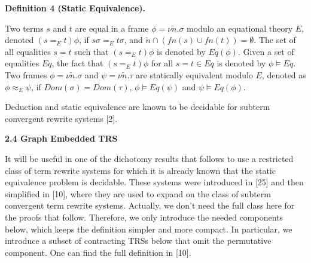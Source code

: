  
 
\par\medskip\noindent\textbf{Definition 4 (Static Equivalence).}\par
 
 
Two terms $s$ and $t$ are equal in a frame $\phi=\nu\tilde{n}.\sigma$ modulo an equational theory $E$, denoted $(s=_{E}t)\phi$, if $s\sigma=_{E}t\sigma$, and ${\tilde{n}}\cap(\mathit{fn}(s)\cup\mathit{fn}(t))=\emptyset$. The set of all equalities $s=t$ such that $(s=_{E}t)\phi$ is denoted by $Eq(\phi)$. Given a set of equalities $Eq$, the fact that $(s=_{E}t)\phi$ for all $s=t\in Eq$ is denoted by $\phi\models Eq$. Two frames $\phi=\nu\tilde{n}.\sigma$ and $\psi=\nu\tilde{n}.\tau$ are statically equivalent modulo $E$, denoted as $\phi\approx_{E}\psi$, if $Dom(\sigma)=Dom(\tau)$, $\phi\models Eq(\psi)$ and $\psi\models Eq(\phi)$.\par
 
 
 
 
Deduction and static equivalence are known to be decidable for subterm convergent rewrite systems [2].\par
 
 
 
 
\par\medskip\noindent\textbf{2.4 Graph Embedded TRS}\par
 
 
It will be useful in one of the dichotomy results that follows to use a restricted class of term rewrite systems for which it is already known that the static equivalence problem is decidable. These systems were introduced in [25] and then simplified in [10], where they are used to expand on the class of subterm convergent term rewrite systems. Actually, we don’t need the full class here for the proofs that follow. Therefore, we only introduce the needed components below, which keeps the definition simpler and more compact. In particular, we introduce a subset of contracting TRSs below that omit the permutative component. One can find the full definition in [10].\par
 
